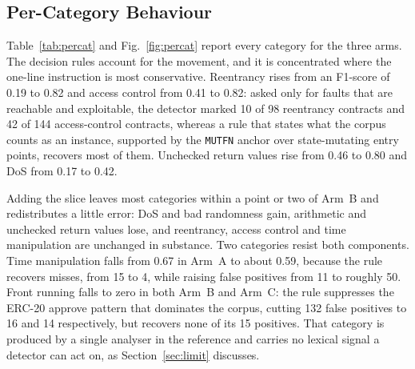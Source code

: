 \documentclass{ieeeaccess}
\begin{document}
\subsection{Per-Category Behaviour}\label{subsec:percat}
Table~\ref{tab:percat} and Fig.~\ref{fig:percat} report every category for the three arms. The decision rules account for the movement, and it is concentrated where the one-line instruction is most conservative. Reentrancy rises from an F1-score of 0.19 to 0.82 and access control from 0.41 to 0.82: asked only for faults that are reachable and exploitable, the detector marked 10 of 98 reentrancy contracts and 42 of 144 access-control contracts, whereas a rule that states what the corpus counts as an instance, supported by the \texttt{MUTFN} anchor over state-mutating entry points, recovers most of them. Unchecked return values rise from 0.46 to 0.80 and DoS from 0.17 to 0.42.

Adding the slice leaves most categories within a point or two of Arm~B and redistributes a little error: DoS and bad randomness gain, arithmetic and unchecked return values lose, and reentrancy, access control and time manipulation are unchanged in substance. Two categories resist both components. Time manipulation falls from 0.67 in Arm~A to about 0.59, because the rule recovers misses, from 15 to 4, while raising false positives from 11 to roughly 50. Front running falls to zero in both Arm~B and Arm~C: the rule suppresses the ERC-20 approve pattern that dominates the corpus, cutting 132 false positives to 16 and 14 respectively, but recovers none of its 15 positives. That category is produced by a single analyser in the reference and carries no lexical signal a detector can act on, as Section~\ref{sec:limit} discusses.
\end{document}
